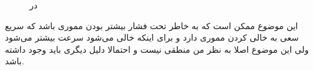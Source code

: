 \begin{figure}[H]
    \quad
    \caption{ در }
    \label{fig:mysql:vm:tpm}
\end{figure}
این موضوع ممکن است که به خاطر تحت فشار بیشتر بودن مموری
باشد که سریع سعی به خالی کردن
مموری دارد و برای اینکه
خالی می‌شود سرعت بیشتر می‌شود ولی این موضوع اصلا به نظر من منطقی نیست و احتمالا دلیل دیگری باید وجود داشته
باشد.